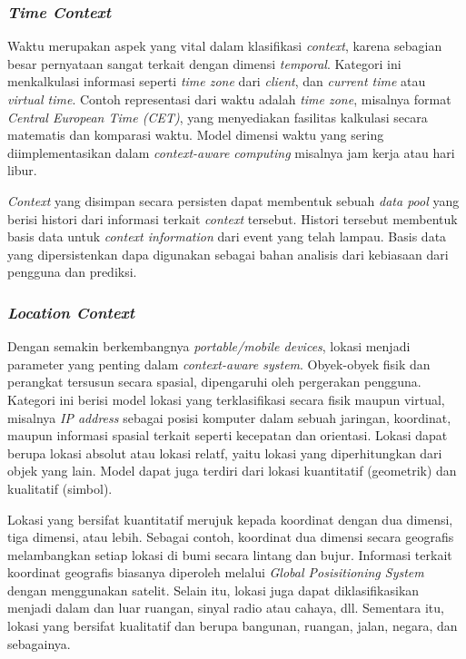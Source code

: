 \subsubsection{\textit{Time Context}}
\label{sssec:time-context}
Waktu merupakan aspek yang vital dalam klasifikasi \textit{context}, karena sebagian besar pernyataan sangat terkait dengan dimensi \textit{temporal}. Kategori ini menkalkulasi informasi seperti \textit{time zone} dari \textit{client}, dan \textit{current time} atau \textit{virtual time}. Contoh representasi dari waktu adalah \textit{time zone}, misalnya format \textit{ Central European Time (CET)}, yang menyediakan fasilitas kalkulasi secara matematis dan komparasi waktu. Model dimensi waktu yang sering diimplementasikan dalam \textit{context-aware computing} misalnya jam kerja atau hari libur.


\textit{Context} yang disimpan secara persisten dapat membentuk sebuah \textit{data pool} yang berisi histori dari informasi terkait \textit{context} tersebut. Histori tersebut membentuk basis data untuk \textit{context information} dari event yang telah lampau. Basis data yang dipersistenkan dapa digunakan sebagai bahan analisis dari kebiasaan dari pengguna dan prediksi.


\subsubsection{\textit{Location Context}}
\label{sssec:location-context}
Dengan semakin berkembangnya \textit{portable/mobile devices}, lokasi menjadi parameter yang penting dalam \textit{context-aware system}. Obyek-obyek fisik dan perangkat tersusun secara spasial, dipengaruhi oleh pergerakan pengguna. Kategori ini berisi model lokasi yang terklasifikasi secara fisik maupun virtual, misalnya \textit{IP address} sebagai posisi komputer dalam sebuah jaringan, koordinat, maupun informasi spasial terkait seperti kecepatan dan orientasi. Lokasi dapat berupa lokasi absolut atau lokasi relatf, yaitu lokasi yang diperhitungkan dari objek yang lain. Model dapat juga terdiri dari lokasi kuantitatif (geometrik) dan kualitatif (simbol).


Lokasi yang bersifat kuantitatif merujuk kepada koordinat dengan dua dimensi, tiga dimensi, atau lebih. Sebagai contoh, koordinat dua dimensi secara geografis melambangkan setiap lokasi di bumi secara lintang dan bujur. Informasi terkait koordinat geografis biasanya diperoleh melalui \textit{Global Posisitioning System} dengan menggunakan satelit. Selain itu, lokasi juga dapat diklasifikasikan menjadi dalam dan luar ruangan, sinyal radio atau cahaya, dll. Sementara itu, lokasi yang bersifat kualitatif dan berupa bangunan, ruangan, jalan, negara, dan sebagainya. 


